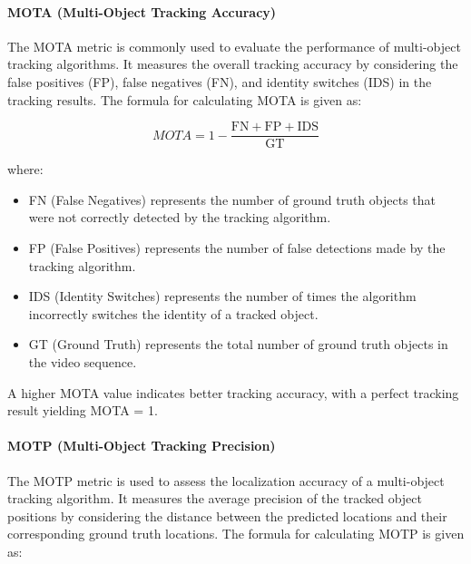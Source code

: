 \paragraph{MOTA (Multi-Object Tracking Accuracy)}
\label{par:4_MOTA}

The MOTA metric is commonly used to evaluate the performance of multi-object tracking algorithms. It measures the overall tracking accuracy by considering the false positives (FP), false negatives (FN), and identity switches (IDS) in the tracking results. The formula for calculating MOTA is given as:

\begin{equation}
	MOTA = 1 - \frac{{\text{{FN}} + \text{{FP}} + \text{{IDS}}}}{{\text{{GT}}}}
\end{equation}

where:

\begin{itemize}
	
	\item FN (False Negatives) represents the number of ground truth objects that were not correctly detected by the tracking algorithm.
	
	\item FP (False Positives) represents the number of false detections made by the tracking algorithm.
	\item IDS (Identity Switches) represents the number of times the algorithm incorrectly switches the identity of a tracked object.
	
	\item GT (Ground Truth) represents the total number of ground truth objects in the video sequence.
	
\end{itemize}

A higher MOTA value indicates better tracking accuracy, with a perfect tracking result yielding MOTA = 1.

\paragraph{MOTP (Multi-Object Tracking Precision)}
\label{par:4_MOTP}

The MOTP metric is used to assess the localization accuracy of a multi-object tracking algorithm. It measures the average precision of the tracked object positions by considering the distance between the predicted locations and their corresponding ground truth locations. The formula for calculating MOTP is given as:

